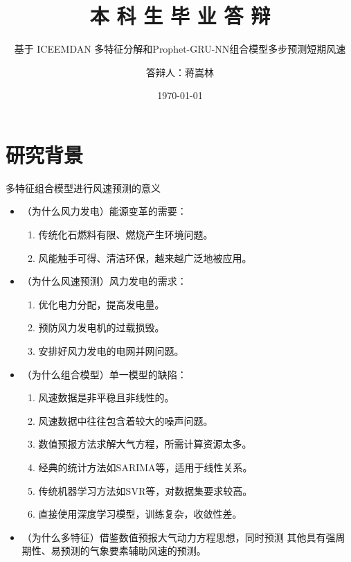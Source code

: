 \documentclass[14pt, AutoFakeBold]{ppt}
\title{本 科 生 毕 业 答 辩}
\subtitle{基于 ICEEMDAN 多特征分解和Prophet-GRU-NN组合模型多步预测短期风速}
\author{答辩人：蒋嵩林}
\institute{指导老师：任超 副教授}
\date{\today}
\begin{document}
\maketitle


\section{研究背景}


\begin{frame}[c]{多特征组合模型进行风速预测的意义}
  \begin{itemize}
    \item （为什么风力发电）能源变革的需要：
    \begin{enumerate}
      \item 传统化石燃料有限、燃烧产生环境问题。
      \item 风能触手可得、清洁环保，越来越广泛地被应用。
    \end{enumerate}

    \item （为什么风速预测）风力发电的需求：
    \begin{enumerate}
      \item 优化电力分配，提高发电量。
      \item 预防风力发电机的过载损毁。
      \item 安排好风力发电的电网并网问题。
    \end{enumerate}

    \item （为什么组合模型）单一模型的缺陷：
    \begin{enumerate}
      \item 风速数据是非平稳且非线性的。
      \item 风速数据中往往包含着较大的噪声问题。
      \item 数值预报方法求解大气方程，所需计算资源太多。
      \item 经典的统计方法如SARIMA等，适用于线性关系。
      \item 传统机器学习方法如SVR等，对数据集要求较高。
      \item 直接使用深度学习模型，训练复杂，收敛性差。
    \end{enumerate}

    \item （为什么多特征）借鉴数值预报大气动力方程思想，同时预测
    其他具有强周期性、易预测的气象要素辅助风速的预测。
  \end{itemize}
\end{frame}
\end{document}
